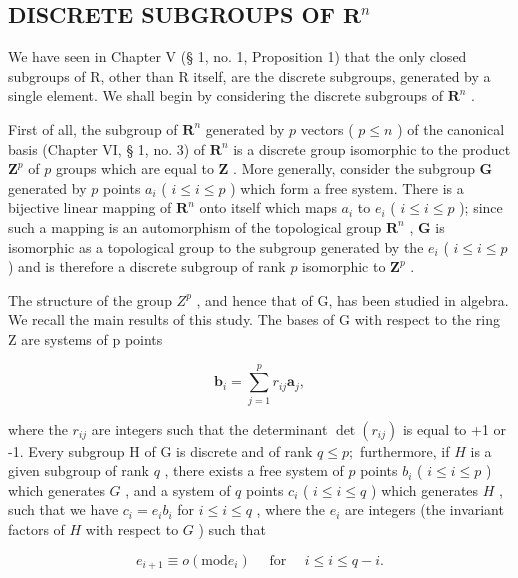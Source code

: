 \subsection{\texorpdfstring{DISCRETE SUBGROUPS OF \(\mathbf{R}^n\)}{DISCRETE SUBGROUPS OF R TO THE N}}

We have seen in Chapter V (§ 1, no. 1, Proposition 1) that the only closed subgroups of R, other than R itself, are the discrete subgroups, generated by a single element. We shall begin by considering the discrete subgroups of \(\mathbf{R}^n\) .

First of all, the subgroup of \(\mathbf{R}^n\) generated by \(p\) vectors ( \(p \leqslant n\) ) of the canonical basis (Chapter VI, § 1, no. 3) of \(\mathbf{R}^n\) is a discrete group isomorphic to the product \(\mathbf{Z}^p\) of \(p\) groups which are equal to \(\mathbf{Z}\) . More generally, consider the subgroup \(\mathbf{G}\) generated by \(p\) points \(a_i\) ( \(i \leqslant i \leqslant p\) ) which form a free system. There is a bijective linear mapping of \(\mathbf{R}^n\) onto itself which maps \(a_i\) to \(e_i\) ( \(i \leqslant i \leqslant p\) ); since such a mapping is an automorphism of the topological group \(\mathbf{R}^n\) , \(\mathbf{G}\) is isomorphic as a topological group to the subgroup generated by the \(e_i\) ( \(i \leqslant i \leqslant p\) ) and is therefore a discrete subgroup of rank \(p\) isomorphic to \(\mathbf{Z}^p\) .

The structure of the group \(Z^{p}\) , and hence that of G, has been studied in algebra. We recall the main results of this study. The bases of G with respect to the ring Z are systems of p points

\[
\boldsymbol {b} _ {i} = \sum_ {j = 1} ^ {p} r _ {i j} \boldsymbol {a} _ {j},
\]

where the \(r_{ij}\) are integers such that the determinant \(\det(r_{ij})\) is equal to +1 or -1. Every subgroup H of G is discrete and of rank \(q \leqslant p;\) furthermore, if \(H\) is a given subgroup of rank \(q\) , there exists a free system of \(p\) points \(b_i\) ( \(i \leqslant i \leqslant p\) ) which generates \(G\) , and a system of \(q\) points \(c_i\) ( \(i \leqslant i \leqslant q\) ) which generates \(H\) , such that we have \(c_i = e_i b_i\) for \(i \leqslant i \leqslant q\) , where the \(e_i\) are integers (the invariant factors of \(H\) with respect to \(G\) ) such that

\[
e _ {i + 1} \equiv o (\mathrm{mod} e _ {i}) \quad \text { for } \quad i \leqslant i \leqslant q - i.
\]

